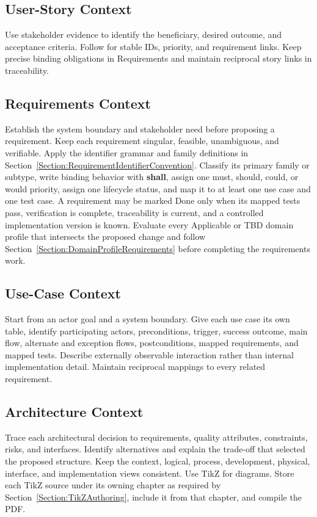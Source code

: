\subsection{User-Story Context}
\label{Section:AIUserStoryContext}
Use stakeholder evidence to identify the beneficiary, desired outcome, and
acceptance criteria. Follow  for stable IDs, priority,
and requirement links. Keep precise binding obligations in Requirements and
maintain reciprocal story links in traceability.

\subsection{Requirements Context}
\label{Section:AIRequirementsContext}
Establish the system boundary and stakeholder need before proposing a
requirement. Keep each requirement singular, feasible, unambiguous, and
verifiable. Apply the identifier grammar and family definitions in
Section~\ref{Section:RequirementIdentifierConvention}. Classify its primary
family or subtype, write binding behavior with
\textbf{shall}, assign one \gls{must}, \gls{should}, \gls{could}, or
\gls{would} priority, assign one lifecycle status, and map it to at least one
use case and one test case. A requirement may be marked Done only when its
mapped tests pass, verification is complete, traceability is current, and a
controlled implementation version is known. Evaluate every Applicable or TBD
domain profile that intersects the proposed change and follow
Section~\ref{Section:DomainProfileRequirements} before completing the
requirements work.

\subsection{Use-Case Context}
\label{Section:AIUseCaseContext}
Start from an actor goal and a system boundary. Give each use case its own
table, identify participating actors, preconditions, trigger, success outcome,
main flow, alternate and exception flows, postconditions, mapped requirements,
and mapped tests. Describe externally observable interaction rather than
internal implementation detail. Maintain reciprocal mappings to every related
requirement.

\subsection{Architecture Context}
\label{Section:AIArchitectureContext}
Trace each architectural decision to requirements, quality attributes,
constraints, risks, and interfaces. Identify alternatives and explain the
trade-off that selected the proposed structure. Keep the context, logical,
process, development, physical, interface, and implementation views consistent.
Use TikZ for diagrams.
Store each TikZ source under its owning chapter as required by
Section~\ref{Section:TikZAuthoring}, include it from that chapter, and compile
the PDF.

